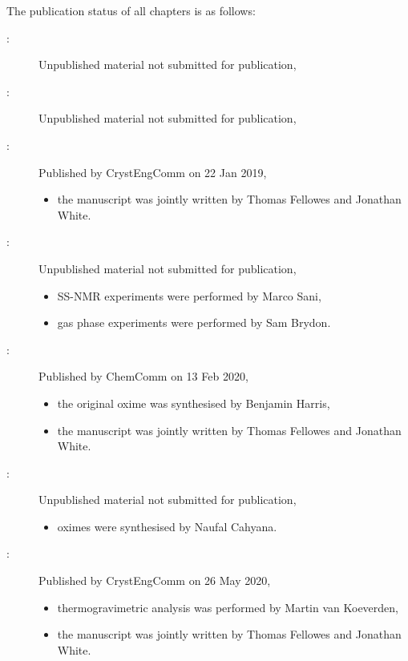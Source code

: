{The publication status of all chapters is as follows:
\begin{description}
    \item[:] Unpublished material not submitted for publication,
    \item[:] Unpublished material not submitted for publication,
    \item[:] Published by CrystEngComm on 22 Jan 2019,
    \begin{itemize}
        \item the manuscript was jointly written by Thomas Fellowes and Jonathan White.
    \end{itemize}
    \item[:] Unpublished material not submitted for publication,
    \begin{itemize}
        \item SS-NMR experiments were performed by Marco Sani,
        \item gas phase experiments were performed by Sam Brydon.
    \end{itemize}
    \item[:] Published by ChemComm on 13 Feb 2020,
    \begin{itemize}
        \item the original oxime  was synthesised by Benjamin Harris,
        \item the manuscript was jointly written by Thomas Fellowes and Jonathan White.
    \end{itemize}
    \item[:] Unpublished material not submitted for publication,
    \begin{itemize}
        \item oximes  were synthesised by Naufal Cahyana.
    \end{itemize}
    \item[:] Published by CrystEngComm on 26 May 2020,
    \begin{itemize}
        \item thermogravimetric analysis was performed by Martin van Koeverden,
        \item the manuscript was jointly written by Thomas Fellowes and Jonathan White.
    \end{itemize}

\end{description}}
